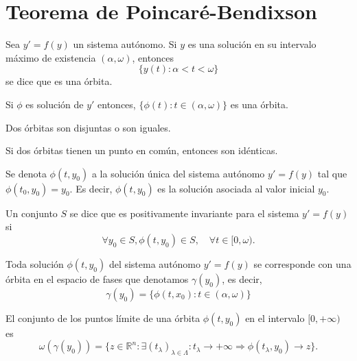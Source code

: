 \section{Teorema de Poincaré-Bendixson}

\begin{defn}[Órbita]
  Sea $y' = f(y)$ un sistema autónomo. Si $y$ es una solución en su intervalo máximo de existencia $(\alpha, \omega)$, entonces
  \[ 
    \{ y(t) : \alpha < t < \omega \}
  \] 
  se dice que es una órbita.
\end{defn}

\begin{obs}
  Si $\phi$ es solución de $y'$ entonces, $\{ \phi(t) : t \in (\alpha, \omega) \}$ es una órbita.
\end{obs}

\begin{prop}
  Dos órbitas son disjuntas o son iguales.
\end{prop}

\begin{prop}
  Si dos órbitas tienen un punto en común, entonces son idénticas.
\end{prop}

\begin{nota}
  Se denota $\phi(t, y_{0})$ a la solución única del sistema autónomo $y' = f(y)$ tal que $\phi(t_{0}, y_{0}) = y_{0}$. Es decir, $\phi(t, y_{0})$ es la solución asociada al valor inicial $y_{0}$.
\end{nota}

\begin{defn}
  Un conjunto $S$ se dice que es positivamente invariante para el sistema $y' = f(y)$ si 
  \[ 
    \forall y_{0} \in S, \phi(t, y_{0}) \in S, \quad \forall t \in [0, \omega).
  \] 
\end{defn}

\begin{nota}
  Toda solución $\phi(t,y_{0})$ del sistema autónomo $y' = f(y)$ se corresponde con una órbita en el espacio de fases que denotamos $\gamma(y_{0})$, es decir,
  \[ 
    \gamma(y_{0}) = \{ \phi(t, x_{0}) : t \in (\alpha, \omega) \} 
  \] 
\end{nota}

\begin{defn}
  El conjunto de los puntos límite de una órbita $\phi(t, y_{0})$ en el intervalo $[0, +\infty)$ es
  \[ 
    \omega(\gamma(y_{0})) = \{ z \in \mathbb{R}^{n} : \exists ( t_{\lambda} )_{\lambda \in \Lambda} : t_{\lambda} \rightarrow +\infty \Rightarrow \phi(t_{\lambda}, y_{0}) \rightarrow z \}.
  \] 
\end{defn}

